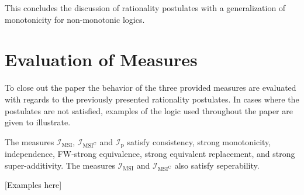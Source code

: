 This concludes the discussion of rationality postulates with a generalization of monotonicity for non-monotonic logics.

\section{Evaluation of Measures}
To close out the paper the behavior of the three provided measures are evaluated with regards to the previously presented rationality postulates. In cases where the postulates are not satisfied, examples of the logic used throughout the paper are given to illustrate.

\begin{proposition}
    The measures \(\mathcal{I}_{\text{MSI}}\), \(\mathcal{I}_{\text{MSI}^\text{C}}\) and \(\mathcal{I}_{\text{p}}\) satisfy consistency, strong monotonicity, independence, FW-strong equivalence, strong equivalent replacement, and strong super-additivity. The measures \(\mathcal{I}_{\text{MSI}}\) and \(\mathcal{I}_{\text{MSI}^\text{C}}\) also satisfy seperability.
\end{proposition}

[Examples here]


